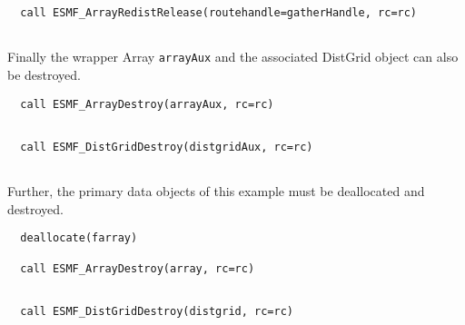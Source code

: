  \begin{verbatim}
  call ESMF_ArrayRedistRelease(routehandle=gatherHandle, rc=rc)
 
\end{verbatim}
 

   Finally the wrapper Array {\tt arrayAux} and the associated DistGrid object
   can also be destroyed. 

 \begin{verbatim}
  call ESMF_ArrayDestroy(arrayAux, rc=rc)
 
\end{verbatim}
 

 \begin{verbatim}
  call ESMF_DistGridDestroy(distgridAux, rc=rc)
 
\end{verbatim}
 

   Further, the primary data objects of this example must be deallocated
   and destroyed. 

 \begin{verbatim}
  deallocate(farray)
  
  call ESMF_ArrayDestroy(array, rc=rc)
 
\end{verbatim}
 

 \begin{verbatim}
  call ESMF_DistGridDestroy(distgrid, rc=rc)
 
\end{verbatim}

\setlength{\parskip}{\oldparskip}
\setlength{\parindent}{\oldparindent}
\setlength{\baselineskip}{\oldbaselineskip}
